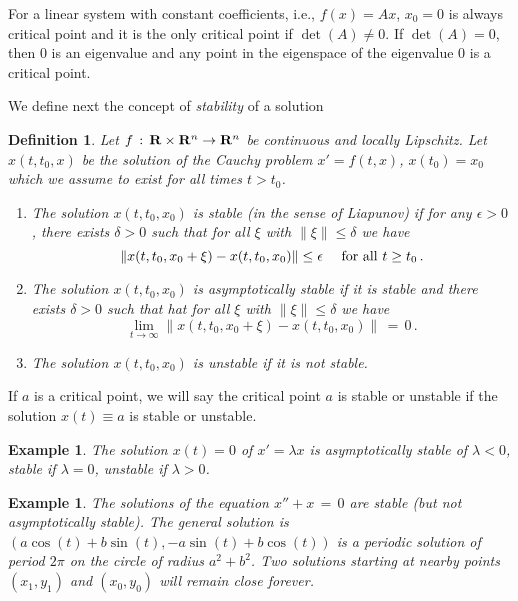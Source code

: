 \documentclass[12pt]{report}
\newcommand{\bR}{{\bf R}}
\newtheorem{example}[theorem]{Example}
\newtheorem{definition}[theorem]{Definition}
\def\to{\rightarrow}
\begin{document}
For a linear system with constant coefficients, i.e., $f(x)=Ax$, 
$x_0=0$ is always critical point and it is the only 
critical point if $\det(A)\not=0$. If $\det(A)=0$, then $0$ is an eigenvalue  
and any point in the eigenspace of the eigenvalue $0$ is a critical point. 

We define next the concept of {\em stability} of a solution 

\begin{definition} Let $f\,:\,\bR \times \bR^n \to \bR^n$ be continuous and 
locally  Lipschitz. Let $x(t,t_0,x)$ be the solution of the Cauchy problem
$x'=f(t,x)$, $x(t_0)=x_0$ which we assume to exist for all times $t >
t_0$.
\begin{enumerate} 
\item The solution $x(t,t_0,x_0)$ is {\em stable} (in the sense of
Liapunov) if for any $\epsilon >0$, there exists $\delta >0$ such that
for all $\xi$ with $\|\xi\| \le \delta$ we have
\begin{equation}
\left\|  x(t,t_0,x_0+\xi)  - x(t,t_0,x_0) \right\| \le \epsilon \quad 
{\rm ~for~all~} t \ge t_0 \,.
\end{equation}
\item The solution $x(t,t_0,x_0)$ is  {\em asymptotically stable}  if it is stable and 
there exists $\delta >0$ such that 
hat for all $\xi$ with $\|\xi\| \le \delta$ we have 
\begin{equation}
\lim_{t \to \infty} \left\|  x(t,t_0,x_0+\xi)  - x(t,t_0,x_0) \right\| \,=\, 
0 \,.
\end{equation}
\item The solution $x(t,t_0,x_0)$ is  {\em unstable} if it is not stable.  
\end{enumerate}
\end{definition} 

If $a$ is a critical point, we will say the critical point $a$ is
stable or unstable if the solution $x(t)\equiv a$ is stable or
unstable.

\begin{example}{\rm 
The solution $x(t)=0$ of $x'=\lambda x$ is asymptotically stable of 
$\lambda < 0$, stable if $\lambda =0$, unstable if $\lambda >0$. 
}
\end{example}

\begin{example}{\rm  
The solutions of the equation $x''+x\,=\,0$ are stable (but not
asymptotically stable).  The general solution is $(a\cos(t) + b
\sin(t), -a\sin(t) + b \cos(t))$ is a periodic solution of period
$2\pi$ on the circle of radius $a^2 +b^2$.  Two solutions starting at
nearby points $(x_1,y_1)$ and $(x_0,y_0)$ will remain close forever.
}
\end{example}
\end{document}
